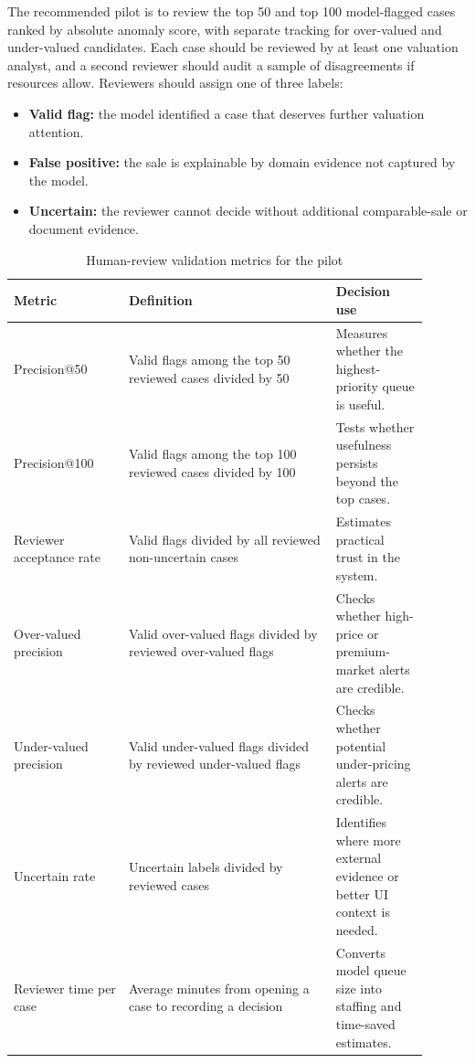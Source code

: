 \documentclass[12pt,a4paper]{article}
\begin{document}
The recommended pilot is to review the top 50 and top 100 model-flagged cases ranked by absolute anomaly score, with separate tracking for over-valued and under-valued candidates. Each case should be reviewed by at least one valuation analyst, and a second reviewer should audit a sample of disagreements if resources allow. Reviewers should assign one of three labels:
\begin{itemize}
    \item \textbf{Valid flag:} the model identified a case that deserves further valuation attention.
    \item \textbf{False positive:} the sale is explainable by domain evidence not captured by the model.
    \item \textbf{Uncertain:} the reviewer cannot decide without additional comparable-sale or document evidence.
\end{itemize}

\begin{table}[H]
\centering
\caption{Human-review validation metrics for the pilot}
\label{tab:human_review_validation}
\begin{tabular}{p{0.25\linewidth}p{0.45\linewidth}p{0.20\linewidth}}
\toprule
\textbf{Metric} & \textbf{Definition} & \textbf{Decision use}\\
\midrule
Precision@50 & Valid flags among the top 50 reviewed cases divided by 50 & Measures whether the highest-priority queue is useful.\\
Precision@100 & Valid flags among the top 100 reviewed cases divided by 100 & Tests whether usefulness persists beyond the top cases.\\
Reviewer acceptance rate & Valid flags divided by all reviewed non-uncertain cases & Estimates practical trust in the system.\\
Over-valued precision & Valid over-valued flags divided by reviewed over-valued flags & Checks whether high-price or premium-market alerts are credible.\\
Under-valued precision & Valid under-valued flags divided by reviewed under-valued flags & Checks whether potential under-pricing alerts are credible.\\
Uncertain rate & Uncertain labels divided by reviewed cases & Identifies where more external evidence or better UI context is needed.\\
Reviewer time per case & Average minutes from opening a case to recording a decision & Converts model queue size into staffing and time-saved estimates.\\
\bottomrule
\end{tabular}
\end{table}
\end{document}
